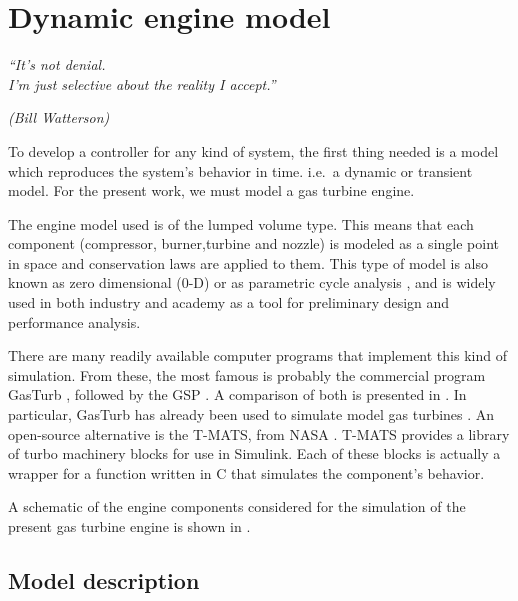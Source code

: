 \chapter{Dynamic engine model}
\label{ch:engine_model}
\epigraph{\em ``It's not denial.\\ I'm just selective about the reality I
accept.''}{\em(Bill Watterson)}

To develop a controller for any kind of system,
 the first thing needed is a model which reproduces the system's behavior in time.
 i.e.\ a dynamic or transient model.
 For the present work, we must model a gas turbine engine.

The engine model used is of the lumped volume type. This means that each component 
 (compressor, burner,turbine and nozzle)
 is modeled as a single point in space and conservation laws are applied to them.
 This type of model is also known as zero dimensional (0-D) or as parametric cycle analysis
 ,
 and is widely used in both industry and academy as a tool for preliminary design and 
 performance analysis. 

There are many readily available computer programs that implement this kind of simulation. 
From these, the most famous is probably the commercial program GasTurb \cite{GasTurb}, 
 
followed by the \gls{GSP} \cite{Visser2000}.
A comparison of both is presented in \textcite{GasTurbvsGSP}.
In particular, GasTurb has already been used to simulate model gas turbines 
 \cite{gao2011modelling}.
An open-source alternative is the \gls{T-MATS}, from NASA \cite{T-MATS}.
\gls{T-MATS} provides a library of turbo machinery blocks for use in Simulink. 
Each of these blocks is actually a wrapper for a function written in C 
 that simulates the component's behavior.

A schematic of the engine components considered for the simulation of the present gas turbine engine is shown in .

\section{Model description}

